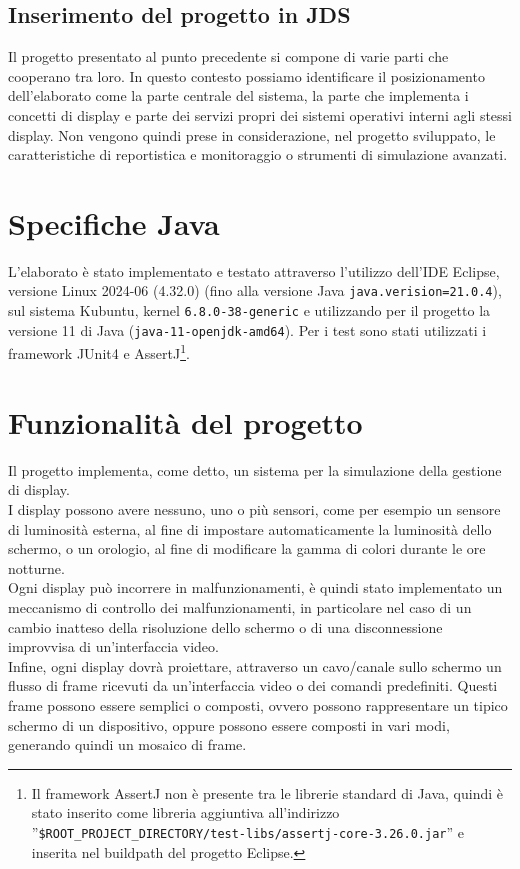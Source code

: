 \documentclass[a4paper,11pt]{article}
\begin{document}
	\subsection{Inserimento del progetto in JDS} \label{jds:inserimento-elaborato}
	Il progetto presentato al punto precedente si compone di varie parti che cooperano tra loro. In questo contesto possiamo identificare il posizionamento dell'elaborato come la parte centrale del sistema, la parte che implementa i concetti di display e parte dei servizi propri dei sistemi operativi interni agli stessi display. Non vengono quindi prese in considerazione, nel progetto sviluppato, le caratteristiche di reportistica e monitoraggio o strumenti di simulazione avanzati.
		
	\section{Specifiche Java}
	L'elaborato è stato implementato e testato attraverso l'utilizzo dell'IDE Eclipse, versione Linux 2024-06 (4.32.0) (fino alla versione Java \texttt{java.verision=21.0.4}), sul sistema Kubuntu, kernel \texttt{6.8.0-38-generic} e utilizzando per il progetto la versione 11 di Java (\texttt{java-11-openjdk-amd64}).
	Per i test sono stati utilizzati i framework JUnit4 e AssertJ\footnote{Il framework AssertJ non è presente tra le librerie standard di Java, quindi è stato inserito come libreria aggiuntiva all'indirizzo ''\texttt{\$ROOT\_PROJECT\_DIRECTORY/test-libs/assertj-core-3.26.0.jar}'' e inserita nel buildpath del progetto Eclipse.}.
	
	\section{Funzionalità del progetto}
	Il progetto implementa, come detto, un sistema per la simulazione della gestione di display.\\
	I display possono avere nessuno, uno o più sensori, come per esempio un sensore di luminosità esterna, al fine di impostare automaticamente la luminosità dello schermo, o un orologio, al fine di modificare la gamma di colori durante le ore notturne.\\
	Ogni display può incorrere in malfunzionamenti, è quindi stato implementato un meccanismo di controllo dei malfunzionamenti, in particolare nel caso di un cambio inatteso della risoluzione dello schermo o di una disconnessione improvvisa di un'interfaccia video.\\
	Infine, ogni display dovrà proiettare, attraverso un cavo/canale sullo schermo un flusso di frame ricevuti da un'interfaccia video o dei comandi predefiniti. Questi frame possono essere semplici o composti, ovvero possono rappresentare un tipico schermo di un dispositivo, oppure possono essere composti in vari modi, generando quindi un mosaico di frame.
	
\end{document}
